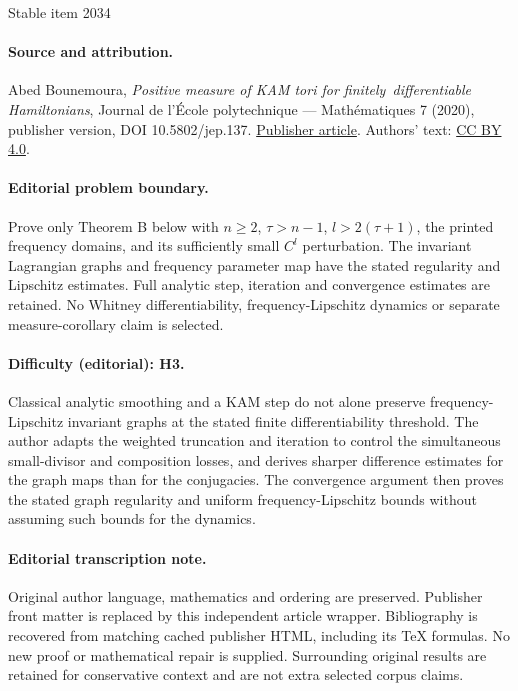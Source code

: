 \documentclass[11pt]{article}
\numberwithin{equation}{section}
\theoremstyle{plain}
\theoremstyle{definition}
\begin{document}
\begin{center}{\Large Stable item 2034}\end{center}
\paragraph{Source and attribution.}
Abed Bounemoura, \emph{Positive measure of KAM tori for finitely differentiable Hamiltonians}, Journal de l’École polytechnique — Mathématiques 7 (2020), publisher version, DOI 10.5802/jep.137. \href{https://jep.centre-mersenne.org/articles/10.5802/jep.137/}{Publisher article}. Authors' text: \href{https://creativecommons.org/licenses/by/4.0/}{CC BY 4.0}.
\paragraph{Editorial problem boundary.}
Prove only Theorem B below with \(n\ge2\), \(\tau>n-1\), \(l>2(\tau+1)\), the printed frequency domains, and its sufficiently small \(C^l\) perturbation. The invariant Lagrangian graphs and frequency parameter map have the stated regularity and Lipschitz estimates. Full analytic step, iteration and convergence estimates are retained. No Whitney differentiability, frequency-Lipschitz dynamics or separate measure-corollary claim is selected.
\paragraph{Difficulty (editorial): H3.}
Classical analytic smoothing and a KAM step do not alone preserve frequency-Lipschitz invariant graphs at the stated finite differentiability threshold. The author adapts the weighted truncation and iteration to control the simultaneous small-divisor and composition losses, and derives sharper difference estimates for the graph maps than for the conjugacies. The convergence argument then proves the stated graph regularity and uniform frequency-Lipschitz bounds without assuming such bounds for the dynamics.
\paragraph{Editorial transcription note.}
Original author language, mathematics and ordering are preserved. Publisher front matter is replaced by this independent article wrapper. Bibliography is recovered from matching cached publisher HTML, including its TeX formulas. No new proof or mathematical repair is supplied. Surrounding original results are retained for conservative context and are not extra selected corpus claims.
\clearpage
\end{document}
